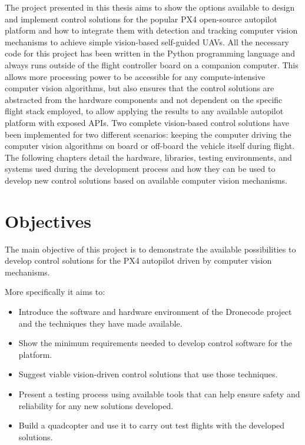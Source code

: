 The project presented in this thesis aims to show the options available to design and implement control solutions for the popular PX4 open-source autopilot platform and how to integrate them with detection and tracking computer vision mechanisms to achieve simple vision-based self-guided UAVs.
All the necessary code for this project has been written in the Python programming language and always runs outside of the flight controller board on a companion computer.
This allows more processing power to be accessible for any compute-intensive computer vision algorithms,
but also ensures that the control solutions are abstracted from the hardware components and not dependent on the specific flight stack employed, 
to allow applying the results to any available autopilot platform with exposed APIs.
Two complete vision-based control solutions have been implemented for two different scenarios: keeping the computer driving the computer vision algorithms on board or off-board the vehicle itself during flight.
The following chapters detail the hardware, libraries, testing environments, and systems used during the development process and how they can be used to develop new control solutions based on available computer vision mechanisms.



\section{Objectives}
\label{sec:objetives}

The main objective of this project is to demonstrate the available possibilities to develop control solutions for the PX4 autopilot driven by computer vision mechanisms.

More specifically it aims to:
\begin{itemize}
    \item Introduce the software and hardware environment of the Dronecode project and the techniques they have made available.
    \item Show the minimum requirements needed to develop control software for the platform.
    \item Suggest viable vision-driven control solutions that use those techniques.
    \item Present a testing process using available tools that can help ensure safety and reliability for any new solutions developed.
    \item Build a quadcopter and use it to carry out test flights with the developed solutions.
\end{itemize}


